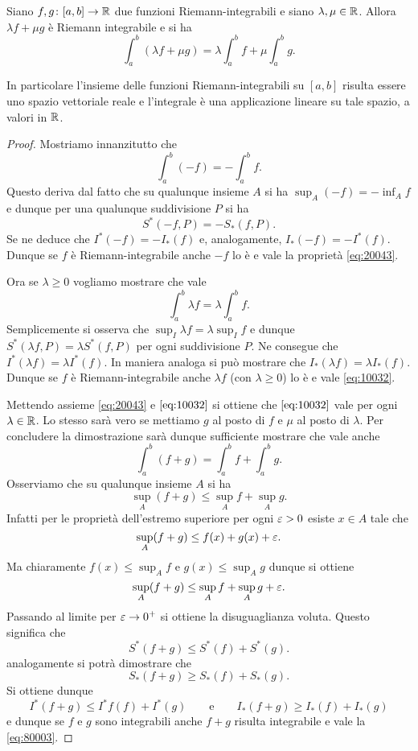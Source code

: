 \begin{theorem}
\mymark{*}
\label{th:integrale_lineare}
Siano $f,g\colon [a,b]\to \mathbb R$ due funzioni Riemann-integrabili
e siano $\lambda, \mu \in \mathbb R$. Allora $\lambda f + \mu g$
è Riemann integrabile e si ha
\[
  \int_a^b (\lambda f + \mu g) = \lambda \int_a^b f + \mu \int_a^b g.
\]

In particolare l'insieme delle funzioni Riemann-integrabili su $[a,b]$ risulta
essere uno spazio vettoriale reale e l'integrale è una
applicazione lineare su tale spazio, a valori in $\mathbb R$.
\end{theorem}
%
\begin{proof}
\mymark{*}
Mostriamo innanzitutto che
\begin{equation}\label{eq:20043}
  \int_a^b (-f) = -\int_a^b f.
\end{equation}
Questo deriva dal fatto che su qualunque insieme $A$ si ha
$\sup_A (-f) = -\inf_A f$ e dunque per una qualunque suddivisione $P$
si ha
\[
  S^*(-f,P) = -S_*(f,P).
\]
Se ne deduce che $I^*(-f) = -I_*(f)$ e, analogamente, $I_*(-f) = -I^*(f)$.
Dunque se $f$ è Riemann-integrabile anche $-f$ lo è e vale la proprietà \eqref{eq:20043}.

Ora se $\lambda \ge 0$ vogliamo mostrare che vale
\begin{equation}\label{eq:10032}
  \int_a^b \lambda f = \lambda \int_a^b f.
\end{equation}
Semplicemente si osserva che $\sup_I \lambda f = \lambda \sup_I f$ e dunque
$S^*(\lambda f,P) = \lambda S^*(f,P)$ per ogni suddivisione $P$.
Ne consegue che $I^*(\lambda f) = \lambda I^*(f)$. In maniera analoga si può
mostrare che $I_*(\lambda f) = \lambda I_*(f)$. Dunque se $f$ è
Riemann-integrabile anche $\lambda f$ (con $\lambda \ge 0$) lo è e vale \eqref{eq:10032}.

Mettendo assieme \eqref{eq:20043} e $\eqref{eq:10032}$ si ottiene
che $\eqref{eq:10032}$ vale per ogni $\lambda \in \mathbb R$.
Lo stesso sarà vero se mettiamo $g$ al posto di $f$ e $\mu$ al posto di $\lambda$.
Per concludere la dimostrazione sarà dunque sufficiente
mostrare che vale anche
\begin{equation*}\label{eq:80003}
\int_a^b (f+g) = \int_a^b f + \int_a^b g.
\end{equation*}
Osserviamo che su qualunque insieme $A$ si ha
\[
  \sup_A (f+g) \le \sup_A f + \sup_A g.
\]
Infatti per le proprietà dell'estremo superiore per ogni $\varepsilon>0$ esiste $x\in A$ tale che
\[
  \sup_A (f+g) \le f(x) + g(x) + \varepsilon.
\]
Ma chiaramente $f(x) \le \sup_A f$ e $g(x)\le \sup_A g$ dunque si ottiene
\[
  \sup_A (f+g) \le \sup_A f + \sup_A g + \varepsilon.
\]
Passando al limite per $\varepsilon \to 0^+$ si ottiene la disuguaglianza voluta.
Questo significa che
\[
  S^*(f+g) \le S^*(f) + S^*(g).
\]
analogamente si potrà dimostrare che
\[
  S_*(f+g) \ge S_*(f) + S_*(g).
\]
Si ottiene dunque
\[
  I^*(f+g) \le I^*f(f) + I^*(g)
  \qquad\text{e}\qquad
  I_*(f+g) \ge I_*(f) + I_*(g)
\]
e dunque se $f$ e $g$ sono integrabili anche $f+g$ risulta integrabile
e vale la \eqref{eq:80003}.


\end{proof}
